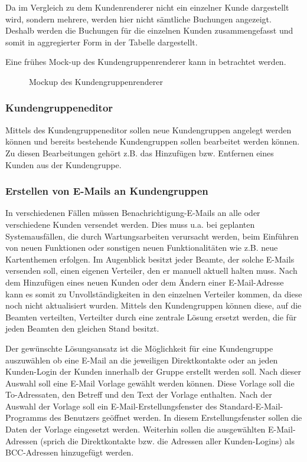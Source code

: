 Da im Vergleich zu dem Kundenrenderer nicht ein einzelner Kunde dargestellt wird, sondern mehrere, werden hier nicht sämtliche Buchungen angezeigt. Deshalb werden die Buchungen für die einzelnen Kunden zusammengefasst und somit in aggregierter Form in der Tabelle dargestellt.

Eine frühes Mock-up des Kundengruppenrenderer kann in  betrachtet werden.
\begin{figure}[htb]
	\centering
	\caption{Mockup des Kundengruppenrenderer}
	\label{fig:mockup-kundengruppenrenderer}
\end{figure}

\subsubsection{Kundengruppeneditor}
Mittels des Kundengruppeneditor sollen neue Kundengruppen angelegt werden können und bereits bestehende Kundengruppen sollen bearbeitet werden können. Zu diesen Bearbeitungen gehört z.B. das Hinzufügen bzw. Entfernen eines Kunden aus der Kundengruppe.

\subsubsection{Erstellen von E-Mails an Kundengruppen}
In verschiedenen Fällen müssen Benachrichtigung-E-Mails an alle oder verschiedene Kunden versendet werden.
Dies muss u.a. bei geplanten Systemausfällen, die durch Wartungsarbeiten verursacht werden, beim Einführen von neuen Funktionen oder sonstigen neuen Funktionalitäten wie z.B. neue Kartenthemen erfolgen.
Im Augenblick besitzt jeder Beamte, der solche E-Mails versenden soll, einen eigenen Verteiler, den er manuell aktuell halten muss.
Nach dem Hinzufügen eines neuen Kunden oder dem Ändern einer E-Mail-Adresse kann es somit zu Unvollständigkeiten in den einzelnen Verteiler kommen, da diese noch nicht aktualisiert wurden.
Mittels den Kundengruppen können diese, auf die Beamten verteilten, Verteilter durch eine zentrale Lösung ersetzt werden, die für jeden Beamten den gleichen Stand besitzt.

Der gewünschte Lösungsansatz ist die Möglichkeit für eine Kundengruppe auszuwählen ob eine E-Mail an die jeweiligen Direktkontakte oder an jeden Kunden-Login der Kunden innerhalb der Gruppe erstellt werden soll.
Nach dieser Auswahl soll eine E-Mail Vorlage gewählt werden können. Diese Vorlage soll die To-Adressaten, den Betreff und den Text der Vorlage enthalten.
Nach der Auswahl der Vorlage soll ein E-Mail-Erstellungsfenster des Standard-E-Mail-Programms des Benutzers geöffnet werden.
In diesem Erstellungsfenster sollen die Daten der Vorlage eingesetzt werden. Weiterhin sollen die ausgewählten E-Mail-Adressen (sprich die Direktkontakte bzw. die Adressen aller Kunden-Logins) als BCC-Adressen hinzugefügt werden.

